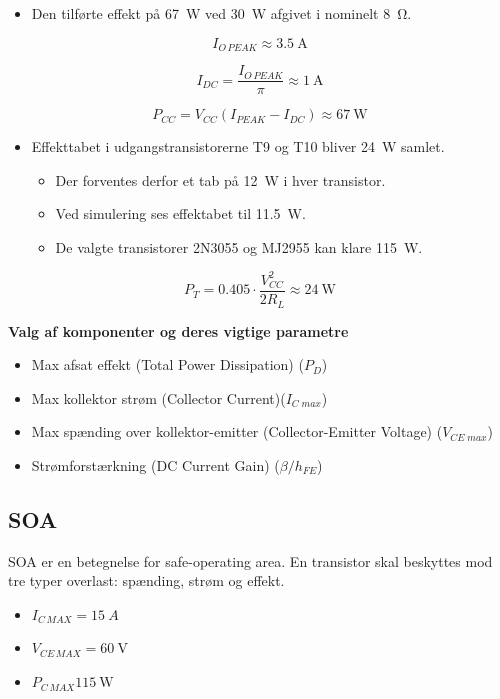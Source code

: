 \documentclass[danish]{article}
\begin{document}
\begin{itemize}
	\item Den tilførte effekt på \SI{67}{\watt} ved \SI{30}{\watt} afgivet i nominelt \SI{8}{\ohm}. 
\end{itemize}

\begin{equation}
I_{O\,PEAK} \approx \SI{3,5}{\ampere}
\end{equation}

\begin{equation}
I_{DC} = \dfrac{I_{O\,PEAK}}{\pi} \approx\SI{1}{\ampere}
\end{equation}

\begin{equation}
P_{CC} = V_{CC}(I_{PEAK}-I_{DC})\approx \SI{67}{\watt}
\end{equation}

\begin{itemize}
	\item Effekttabet i udgangstransistorerne T9 og T10 bliver \SI{24}{\watt} samlet.
	\begin{itemize}
		\item Der forventes derfor et tab på \SI{12}{\watt} i hver transistor.
		\item Ved simulering ses effektabet til \SI{11.5}{\watt}.
		\item De valgte transistorer 2N3055 og MJ2955 kan klare \SI{115}{\watt}.
	\end{itemize}
\end{itemize} 

\begin{equation}
P_T = 0.405 \cdot \dfrac{V_{CC}^2}{2 R_L} \approx \SI{24}{\watt}
\end{equation}

\textbf{Valg af komponenter og deres vigtige parametre}

\begin{itemize}
	\item Max afsat effekt (Total Power Dissipation) ($P_D$)
	\item Max kollektor strøm (Collector Current)($I_{C\;max}$)
	\item Max spænding over kollektor-emitter (Collector-Emitter Voltage) ($V_{CE\;max}$)
	\item Strømforstærkning (DC Current Gain) ($\beta / h_{FE}$)
\end{itemize}

\subsection{SOA}
SOA er en betegnelse for safe-operating area.
En transistor skal beskyttes mod tre typer overlast:
\newline spænding, strøm og effekt.
\begin{itemize}
	\item $I_{C\,MAX} = \SI{15}{A}$
	\item  $V_{CE\,MAX} = \SI{60}{\volt}$
	\item  $P_{C\,MAX} \SI{115}{\watt}$
\end{itemize}
\end{document}
